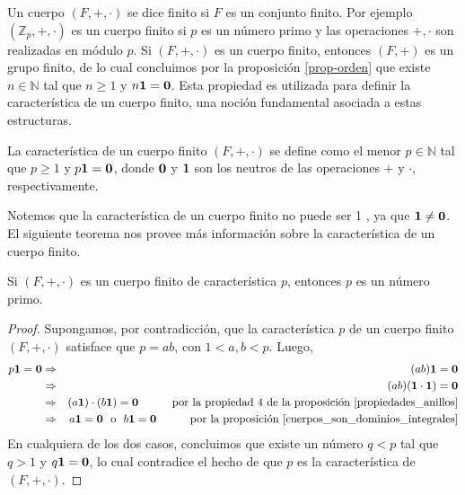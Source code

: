 Un cuerpo $(F,+,\cdot)$ se dice finito si $F$ es un conjunto
finito. Por ejemplo $(\mathbb{Z}_p, +, \cdot)$ es un cuerpo finito si
$p$ es un número primo y las operaciones $+, \cdot$ son realizadas en
módulo $p$.
Si $(F,+,\cdot)$ es un cuerpo finito, entonces $(F,+)$ es un grupo
finito, de lo cual concluimos por la proposición \ref{prop-orden} que
existe $n \in \mathbb{N}$ tal que $n \geq 1$ y $n \mathbf{1} = \mathbf{0}$. Esta propiedad es
utilizada para definir la característica de un cuerpo finito, una
noción fundamental asociada a estas estructuras.
\begin{definition}
La característica de un cuerpo finito $(F, +, \cdot)$ se define como el menor $p\in \mathbb{N}$ tal que $p \geq 1$ y $p \mathbf{1} = \mathbf{0}$, donde $\mathbf{0}$ y $\mathbf{1}$ son los neutros de las operaciones $+$ y $\cdot$, respectivamente.
\end{definition}
Notemos que la característica de un cuerpo finito no puede ser 1 , ya
que $\mathbf{1} \neq \mathbf{0} $. El siguiente teorema nos provee más información
sobre la característica de un cuerpo finito.
\begin{theorem}\label{caracteristica primo}
Si $(F,+,\cdot)$ es un cuerpo finito de característica $p$, entonces
$p$ es un número primo.
\end{theorem}
\begin{proof}
Supongamos, por contradicción, que la característica $p$ de un cuerpo
finito $(F, +, \cdot)$ satisface que $p = ab$, con $1<a, b<p$. Luego,
\begin{eqnarray*}
	p\mathbf{1}  = \mathbf{0} &\Rightarrow & (a b)\mathbf{1} = \mathbf{0} \\
        &\Rightarrow & (a b) (\mathbf{1} \cdot \mathbf{1}) = \mathbf{0} \\
	&\Rightarrow & (a\mathbf{1}) \cdot (b\mathbf{1}) =  \mathbf{0} \quad\quad\quad \text{por la propiedad 4 de la proposición \ref{propiedades_anillos}}\\
	&\Rightarrow& a \mathbf{1}  = \mathbf{0} \ \text{ o } \ b\mathbf{1}  = \mathbf{0} \quad\quad\quad \text{por la proposición \ref{cuerpos_son_dominios_integrales}}
\end{eqnarray*}
En cualquiera de los dos casos, concluimos que existe un número $q <
p$ tal que $q > 1$ y $q \mathbf{1} = \mathbf{0}$, lo cual contradice el hecho de que
$p$ es la característica de $(F, +, \cdot)$.
\end{proof}
